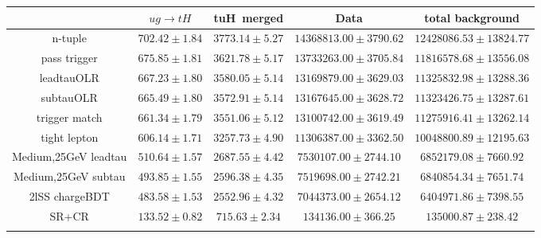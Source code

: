 \centering
\begin{tabular}{ccccc} \toprule\toprule
 & $ug\to tH$ & tuH~merged & Data & total background\\\midrule
n-tuple & $702.42\pm1.84$ & $3773.14\pm5.27$ & $14368813.00\pm3790.62$ & $12428086.53\pm13824.77$\\
pass trigger & $675.85\pm1.81$ & $3621.78\pm5.17$ & $13733263.00\pm3705.84$ & $11816578.68\pm13556.08$\\
leadtauOLR & $667.23\pm1.80$ & $3580.05\pm5.14$ & $13169879.00\pm3629.03$ & $11325832.98\pm13288.36$\\
subtauOLR & $665.49\pm1.80$ & $3572.91\pm5.14$ & $13167645.00\pm3628.72$ & $11323426.75\pm13287.61$\\
trigger match & $661.34\pm1.79$ & $3551.06\pm5.12$ & $13100742.00\pm3619.49$ & $11275916.41\pm13262.14$\\
tight lepton & $606.14\pm1.71$ & $3257.73\pm4.90$ & $11306387.00\pm3362.50$ & $10048800.89\pm12195.63$\\
Medium,25GeV leadtau & $510.64\pm1.57$ & $2687.55\pm4.42$ & $7530107.00\pm2744.10$ & $6852179.08\pm7660.92$\\
Medium,25GeV subtau & $493.85\pm1.55$ & $2596.38\pm4.35$ & $7519698.00\pm2742.21$ & $6840854.34\pm7651.74$\\
2lSS chargeBDT & $483.58\pm1.53$ & $2552.96\pm4.32$ & $7044373.00\pm2654.12$ & $6404971.86\pm7398.55$\\
SR+CR & $133.52\pm0.82$ & $715.63\pm2.34$ & $134136.00\pm366.25$ & $135000.87\pm238.42$\\
\bottomrule\bottomrule\\
\end{tabular}
